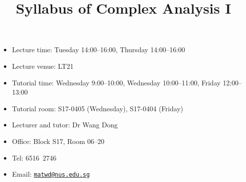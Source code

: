 \documentclass[a4paper]{article}
\title{Syllabus of Complex Analysis I}
\date{}
\begin{document}
\maketitle

\begin{minipage}[t]{0.5\linewidth}
  \begin{itemize}[leftmargin=*]
  \item Lecture time: Tuesday 14:00--16:00, Thursday 14:00--16:00
  \item Lecture venue: LT21
  \item Tutorial time: Wednesday 9:00--10:00, Wednesday 10:00--11:00, Friday 12:00--13:00
  \item Tutorial room: S17-0405 (Wednesday), S17-0404 (Friday) 
  \end{itemize}
\end{minipage}
\begin{minipage}[t]{0.4\linewidth}
  \begin{itemize}
  \item Lecturer and tutor: Dr Wang Dong
  \item Office: Block S17, Room 06--20
  \item Tel: 6516\ 2746
  \item Email: \href{mailto:matwd@nus.edu.sg}{\nolinkurl{matwd@nus.edu.sg}}
  \end{itemize}
\end{minipage}
\end{document}
